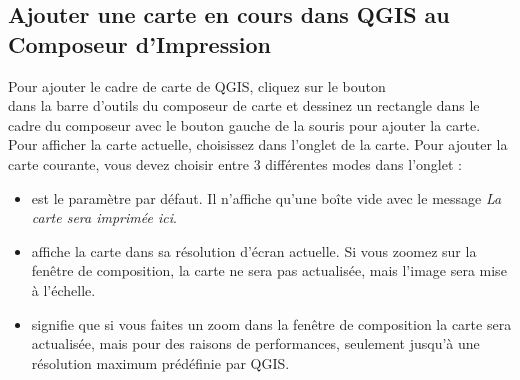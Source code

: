 \subsection{Ajouter une carte en cours dans QGIS au Composeur d'Impression}

Pour ajouter le cadre de carte de QGIS, cliquez sur le bouton\\  dans la barre d'outils du composeur de carte et dessinez un rectangle dans le cadre du composeur avec le bouton gauche de la souris pour ajouter la carte. Pour afficher la carte actuelle, choisissez  dans l'onglet  de la carte.
Pour ajouter la carte courante, vous devez choisir entre 3 différentes modes dans l'onglet  :


\begin{itemize}[label=--]
\item {} est le paramètre par défaut. Il n'affiche qu'une boîte vide avec le message \og\textit{La carte sera imprimée ici}\fg. 
\item {} affiche la carte dans sa résolution d'écran actuelle. Si vous zoomez sur la fenêtre de composition, la carte ne sera pas actualisée, mais l'image sera mise à l'échelle.
\item {} signifie que si vous faites un zoom dans la fenêtre de composition la carte sera actualisée, mais pour des raisons de performances, seulement jusqu'à une résolution maximum prédéfinie par QGIS.
\end{itemize}


